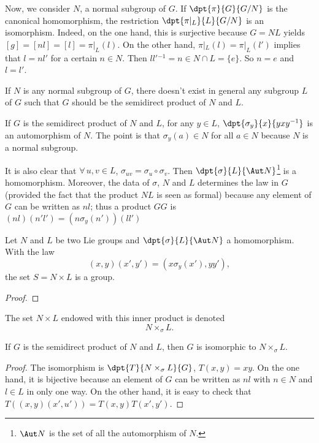 Now, we consider $N$, a normal subgroup of $G$. If $\dpt{\pi}{G}{G/N}$ is the canonical homomorphism, the restriction $\dpt{\pi|_L}{L}{G/N}$ is an isomorphism. Indeed, on the one hand, this is surjective because $G=NL$ yields
$[g]=[nl]=[l]=\pi|_L(l)$. On the other hand, $\pi|_L(l)=\pi|_L(l')$ implies that $l=nl'$ for a certain $n\in N$. Then $ll'{}^{-1}=n\in N\cap L=\{e\}$. So $n=e$ and $l=l'$.

\begin{remark}
	If $N$ is any normal subgroup of $G$, there doesn't exist in general any subgroup $L$ of $G$ such that $G$ should be the semidirect product of $N$ and $L$.
\end{remark}

If $G$ is the semidirect product of $N$ and $L$, for any $y\in L$, $\dpt{\sigma_y}{x}{yxy^{-1}}$ is an automorphism of $N$. The point is that $\sigma_y(a)\in N$ for all $a\in N$ because $N$ is a normal subgroup.

It is also clear that $\forall\,u,v\in L$, $\sigma_{uv}=\sigma_u\circ\sigma_v$. Then $\dpt{\sigma}{L}{\Aut N}$\footnote{$\Aut N$ is the set of all the automorphism of $N$.} is a homomorphism. Moreover, the data of $\sigma$, $N$ and $L$ determines the law in $G$ (provided the fact that the product $NL$ is seen as formal) because any element of $G$ can be written as $nl$; thus a product $GG$ is $(nl)(n'l')=(n\sigma_y(n'))(ll')$

\begin{proposition}
	Let $N$ and $L$ be two Lie groups and $\dpt{\sigma}{L}{\Aut N}$ a homomorphism. With the law
	\[
		(x,y)(x',y')=(x\sigma_y(x'),yy'),
	\]
	the set $S=N\times L$ is a group.

\end{proposition}
\begin{proof}
\end{proof}

The set $N\times L$ endowed with this inner product is denoted
\[
	N\times_{\sigma}L.
\]

\begin{proposition}
	If $G$ is the semidirect product of $N$ and $L$, then $G$ is isomorphic to $N\times_{\sigma} L$.
\end{proposition}

\begin{proof}
	The isomorphism is $\dpt{T}{N\times_{\sigma}L}{G}$, $T(x,y)=xy$. On the one hand, it is bijective because an element of $G$ can be written as $nl$ with $n\in N$ and $l\in L$ in only one way. On the other hand, it is easy to check that $T( (x,y)(x',u') )=T(x,y)T(x',y')$.
\end{proof}

